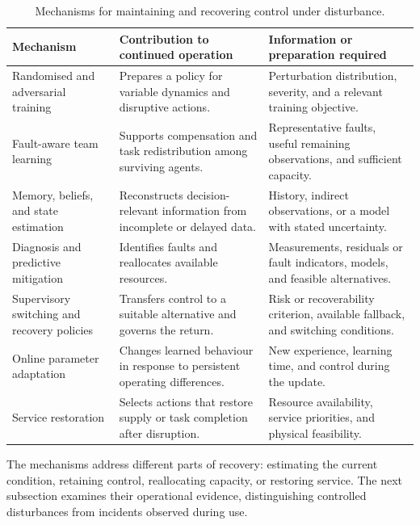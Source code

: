 \begin{table}[!htbp]
\centering
\caption{Mechanisms for maintaining and recovering control under disturbance.}
\label{tab:ch3-robustness-mechanisms}
\small
\setlength{\tabcolsep}{4pt}
\renewcommand{\arraystretch}{1.08}
\begin{tabularx}{\textwidth}{@{}>{\raggedright\arraybackslash}p{}>{\raggedright\arraybackslash}X>{\raggedright\arraybackslash}X@{}}
\toprule
Mechanism & Contribution to continued operation & Information or preparation required\\
\midrule
Randomised and adversarial training & Prepares a policy for variable dynamics and disruptive actions. & Perturbation distribution, severity, and a relevant training objective.\\
\addlinespace
Fault-aware team learning & Supports compensation and task redistribution among surviving agents. & Representative faults, useful remaining observations, and sufficient capacity.\\
\addlinespace
Memory, beliefs, and state estimation & Reconstructs decision-relevant information from incomplete or delayed data. & History, indirect observations, or a model with stated uncertainty.\\
\addlinespace
Diagnosis and predictive mitigation & Identifies faults and reallocates available resources. & Measurements, residuals or fault indicators, models, and feasible alternatives.\\
\addlinespace
Supervisory switching and recovery policies & Transfers control to a suitable alternative and governs the return. & Risk or recoverability criterion, available fallback, and switching conditions.\\
\addlinespace
Online parameter adaptation & Changes learned behaviour in response to persistent operating differences. & New experience, learning time, and control during the update.\\
\addlinespace
Service restoration & Selects actions that restore supply or task completion after disruption. & Resource availability, service priorities, and physical feasibility.\\
\bottomrule
\end{tabularx}
\end{table}

The mechanisms address different parts of recovery: estimating the current condition, retaining control, reallocating capacity, or restoring service. The next subsection examines their operational evidence, distinguishing controlled disturbances from incidents observed during use.


